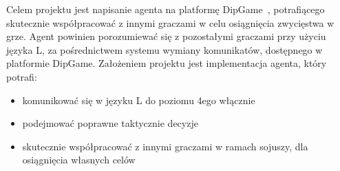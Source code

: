 Celem projektu jest napisanie agenta na platformę DipGame~\cite{3718}, potrafiącego skutecznie współpracować z innymi graczami w celu osiągnięcia
zwycięstwa w grze. Agent powinien porozumiewać się z pozostałymi graczami przy użyciu języka L, za pośrednictwem systemu wymiany komunikatów, dostępnego w platformie DipGame. Założeniem projektu jest implementacja agenta, który potrafi:
\begin{itemize}
	\item{komunikować się w języku L do poziomu 4ego włącznie}
	\item{podejmować poprawne taktycznie decyzje}
	\item{skutecznie współpracować z innymi graczami w ramach sojuszy, dla osiągnięcia własnych celów}
\end{itemize}
